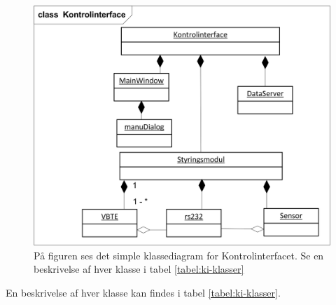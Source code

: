 \begin{figure}[htbp]
\centering
\label{fig:kd_simpel}
\includegraphics[width=1\textwidth]{billeder/GUI/klassediagram_simpel}
\caption{På figuren ses det simple klassediagram for Kontrolinterfacet. Se en beskrivelse af hver klasse i tabel \ref{tabel:ki-klasser}}
\end{figure}

En beskrivelse af hver klasse kan findes i tabel \ref{tabel:ki-klasser}.\\
 

